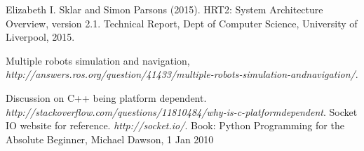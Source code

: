 \documentclass{report}
\begin{document}
\begin{thebibliography}{9}
      Elizabeth I. Sklar and Simon Parsons (2015). HRT2: System Architecture Overview, version 2.1. Technical Report, Dept of Computer Science, University of Liverpool, 2015.

      Multiple robots simulation and navigation, \emph{http://answers.ros.org/question/41433/multiple-robots-simulation-andnavigation/}.

      Discussion on C++ being platform dependent. \emph{http://stackoverflow.com/questions/11810484/why-is-c-platformdependent}.
      Socket IO website for reference. \emph{http://socket.io/}.
       Book: Python Programming for the Absolute Beginner, Michael Dawson, 1 Jan 2010



  \end{thebibliography}


 
\end{document}
